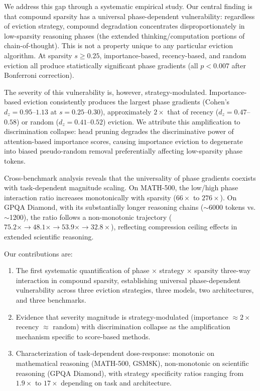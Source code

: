 \documentclass[11pt]{article}
\begin{document}
We address this gap through a systematic empirical study. Our central finding is that compound sparsity has a universal phase-dependent vulnerability: regardless of eviction strategy, compound degradation concentrates disproportionately in low-sparsity reasoning phases (the extended thinking/computation portions of chain-of-thought). This is not a property unique to any particular eviction algorithm. At sparsity $s \geq 0.25$, importance-based, recency-based, and random eviction all produce statistically significant phase gradients (all $p < 0.007$ after Bonferroni correction).

The severity of this vulnerability is, however, strategy-modulated. Importance-based eviction consistently produces the largest phase gradients (Cohen's $d_z = 0.95$--$1.13$ at $s = 0.25$--$0.30$), approximately $2\times$ that of recency ($d_z = 0.47$--$0.58$) or random ($d_z = 0.41$--$0.52$) eviction. We attribute this amplification to discrimination collapse: head pruning degrades the discriminative power of attention-based importance scores, causing importance eviction to degenerate into biased pseudo-random removal preferentially affecting low-sparsity phase tokens.

Cross-benchmark analysis reveals that the universality of phase gradients coexists with task-dependent magnitude scaling. On MATH-500, the low/high phase interaction ratio increases monotonically with sparsity ($66\times$ to $276\times$). On GPQA Diamond, with its substantially longer reasoning chains ($\sim$6000 tokens vs. $\sim$1200), the ratio follows a non-monotonic trajectory ($75.2\times \to 48.1\times \to 53.9\times \to 32.8\times$), reflecting compression ceiling effects in extended scientific reasoning.

Our contributions are:
\begin{enumerate}
    \item The first systematic quantification of phase $\times$ strategy $\times$ sparsity three-way interaction in compound sparsity, establishing universal phase-dependent vulnerability across three eviction strategies, three models, two architectures, and three benchmarks.
    \item Evidence that severity magnitude is strategy-modulated (importance $\approx 2\times$ recency $\approx$ random) with discrimination collapse as the amplification mechanism specific to score-based methods.
    \item Characterization of task-dependent dose-response: monotonic on mathematical reasoning (MATH-500, GSM8K), non-monotonic on scientific reasoning (GPQA Diamond), with strategy specificity ratios ranging from $1.9\times$ to $17\times$ depending on task and architecture.
\end{enumerate}
\end{document}

